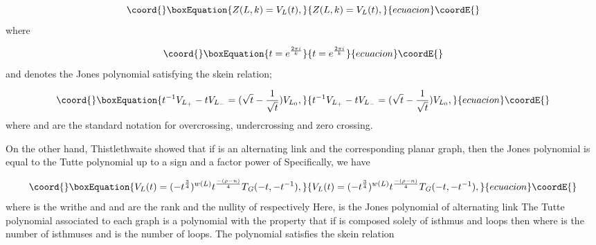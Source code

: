 \documentclass[a4paper,12pt]{article}
\begin{document}
\begin{equation}\coord{}\boxEquation{
Z(L,k)=V_{L}(t),  \label{9}
}{
Z(L,k)=V_{L}(t),  }{ecuacion}\coordE{}\end{equation}
where

\begin{equation}\coord{}\boxEquation{
t=e^{\frac{2\pi i}{k}}  \label{10}
}{
t=e^{\frac{2\pi i}{k}}  }{ecuacion}\coordE{}\end{equation}
and \coordHE{} denotes the Jones polynomial satisfying the skein relation;

\begin{equation}\coord{}\boxEquation{
t^{-1}V_{L_{+}}-tV_{L_{-}}=(\sqrt{t}-\frac{1}{\sqrt{t}})V_{L_{0}},
\label{11}
}{
t^{-1}V_{L_{+}}-tV_{L_{-}}=(\sqrt{t}-\frac{1}{\sqrt{t}})V_{L_{0}},
}{ecuacion}\coordE{}\end{equation}
where \coordHE{} and \coordHE{} are the standard notation for overcrossing,
undercrossing and zero crossing.

On the other hand, Thistlethwaite\coordHE{} showed that if \coordHE{} is an
alternating link and \coordHE{} the corresponding planar graph, then
the Jones polynomial \coordHE{} is equal to the Tutte polynomial \coordHE{} up to a sign and a factor power of \coordHE{} Specifically, we
have

\begin{equation}\coord{}\boxEquation{
V_{L}(t)=(-t^{\frac{3}{4}})^{w(L)}t^{\frac{-(\rho -n)}{4}}T_{\mathit{G}
}(-t,-t^{-1}),  \label{12}
}{
V_{L}(t)=(-t^{\frac{3}{4}})^{w(L)}t^{\frac{-(\rho -n)}{4}}T_{\mathit{G}
}(-t,-t^{-1}),  }{ecuacion}\coordE{}\end{equation}
where \coordHE{} is the writhe and \myHighlight{$\rho $}\coordHE{} and \coordHE{} are the rank and the nullity
of \coordHE{} respectively\coordHE{} Here, \coordHE{} is the Jones polynomial of
alternating link \coordHE{} The Tutte polynomial associated to each graph \coordHE{} is a polynomial \coordHE{} with the property that if \coordHE{} is composed solely of isthmus and loops then \coordHE{} where \coordHE{} is the number of isthmuses and \coordHE{} is
the number of loops. The polynomial \coordHE{} satisfies the skein
relation
\end{document}

